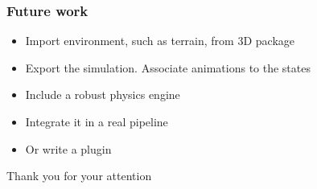 \documentclass{beamer}
\begin{document}
\begin{frame}
\frametitle{Future work}
  \begin{center}
     \begin{itemize}
      \item Import environment, such as terrain, from 3D package
      \item Export the simulation. Associate animations to the states
      \item Include a robust physics engine
      \item Integrate it in a real pipeline
      \item Or write a plugin
     \end{itemize}
  \end{center}
\end{frame}

\begin{frame}
\begin{center}
	Thank you for your attention
\end{center}
\end{frame}
\end{document}
